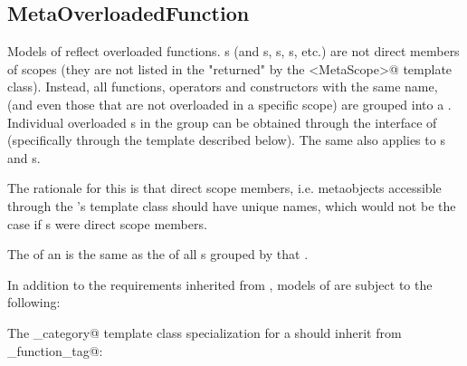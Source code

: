 \subsection{MetaOverloadedFunction}
\label{concept-MetaOverloadedFunction}



Models of  reflect overloaded functions.
s (and s, s, s, etc.)
are not direct members of scopes (they are not listed in the 
"returned" by the \verb@members<MetaScope>@ template class).
Instead, all functions, operators and constructors with the same name, (and even those that are not
overloaded in a specific scope) are grouped into a . Individual overloaded s
in the group can be obtained through the interface of  (specifically through the
\verb@overloads@ template described below). The same also applies to s and s.

The rationale for this is that direct scope members, i.e. metaobjects accessible through the 's
\verb@members@ template class should have unique names, which would not be the case if s
were direct scope members.

The \verb@scope@ of an  is the same as the \verb@scope@
of all s grouped by that .

In addition to the requirements inherited from ,
models of  are subject to the following:

The \verb@metaobject_category@ template class specialization for a 
should inherit from \verb@overloaded_function_tag@:

